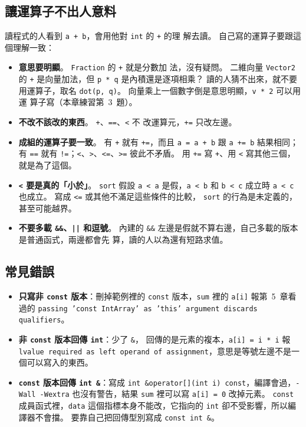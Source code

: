 \subsection{讓運算子不出人意料}

讀程式的人看到 \texttt{a + b}，會用他對 \texttt{int} 的 \texttt{+} 的理
解去讀。 自己寫的運算子要跟這個理解一致：

\begin{itemize}
\item \textbf{意思要明顯}。 \texttt{Fraction} 的 \texttt{+} 就是分數加
法，沒有疑問。 二維向量 \texttt{Vector2} 的 \texttt{+} 是向量加法，但
\texttt{p * q} 是內積還是逐項相乘？ 讀的人猜不出來，就不要用運算子，取名
\texttt{dot(p, q)}。 向量乘上一個數字倒是意思明顯，\texttt{v * 2} 可以用運
算子寫（本章練習第~3~題）。
\item \textbf{不改不該改的東西}。 \texttt{+}、\texttt{==}、\texttt{<} 不
改運算元，\texttt{+=} 只改左邊。
\item \textbf{成組的運算子要一致}。 有 \texttt{+} 就有 \texttt{+=}，而且
\texttt{a = a + b} 跟 \texttt{a += b} 結果相同；有 \texttt{==} 就有
\texttt{!=}；\texttt{<}、\texttt{>}、\texttt{<=}、\texttt{>=} 彼此不矛盾。
用 \texttt{+=} 寫 \texttt{+}、用 \texttt{<} 寫其他三個，就是為了這個。
\item \textbf{\texttt{<} 要是真的「小於」}。 \texttt{sort} 假設
\texttt{a < a} 是假，\texttt{a < b} 和 \texttt{b < c} 成立時
\texttt{a < c} 也成立。 寫成 \texttt{<=} 或其他不滿足這些條件的比較，
\texttt{sort} 的行為是未定義的，甚至可能越界。
\item \textbf{不要多載 \texttt{\&\&}、\texttt{||} 和逗號}。 內建的
\texttt{\&\&} 左邊是假就不算右邊，自己多載的版本是普通函式，兩邊都會先
算，讀的人以為還有短路求值。
\end{itemize}

\subsection{常見錯誤}

\begin{itemize}
\item \textbf{只寫非 \texttt{const} 版本}：刪掉範例裡的 \texttt{const}
版本，\texttt{sum} 裡的 \texttt{a[i]} 報第~5~章看過的
\texttt{passing 'const IntArray' as 'this' argument discards
qualifiers}。
\item \textbf{非 \texttt{const} 版本回傳 \texttt{int}}：少了 \texttt{\&}，
回傳的是元素的複本，\texttt{a[i] = i * i} 報 \texttt{lvalue required as
left operand of assignment}，意思是等號左邊不是一個可以寫入的東西。
\item \textbf{\texttt{const} 版本回傳 \texttt{int \&}}：寫成
\texttt{int \&operator[](int i) const}，編譯會過，\texttt{-Wall -Wextra}
也沒有警告，結果 \texttt{sum} 裡可以寫 \texttt{a[i] = 0} 改掉元素。
\texttt{const} 成員函式裡，\texttt{data} 這個指標本身不能改，它指向的
\texttt{int} 卻不受影響，所以編譯器不會擋。 要靠自己把回傳型別寫成
\texttt{const int \&}。
\end{itemize}

